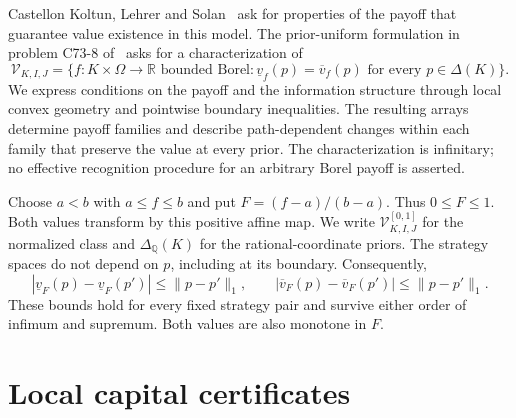 \documentclass[11pt,a4paper]{article}
\theoremstyle{definition}
\theoremstyle{remark}
\newcommand{\R}{\mathbb R}
\newcommand{\lv}{\underline v}
\newcommand{\uv}{\overline v}
\newcommand{\VV}{\mathcal V}
\begin{document}
Castellon Koltun, Lehrer and Solan~\cite[Section~5]{KLS} ask for properties of
the payoff that guarantee value existence in this model. The
prior-uniform formulation in problem C73-8 of~\cite{Catalogue} asks
for a characterization of
\[
 \VV_{K,I,J}
 =\{f:K\times\Omega\to\R\text{ bounded Borel}:
           \lv_f(p)=\uv_f(p)\text{ for every }p\in\Delta(K)\}.
\]
We express conditions on the payoff and the
information structure through local convex geometry and pointwise
boundary inequalities. The resulting arrays determine payoff families
and describe path-dependent changes within each family that preserve
the value at every prior.
The characterization is infinitary; no effective recognition
procedure for an arbitrary Borel payoff is asserted.

Choose $a<b$ with $a\leq f\leq b$ and put $F=(f-a)/(b-a)$. Thus
$0\leq F\leq1$. Both values transform by this positive affine map.
We write $\VV^{[0,1]}_{K,I,J}$ for the normalized class and
$\Delta_{\mathbb Q}(K)$ for the rational-coordinate priors. The
strategy spaces do not depend on $p$, including at its boundary.
Consequently,
\begin{equation}\label{eq:lipschitz}
 |\lv_F(p)-\lv_F(p')|\leq\|p-p'\|_1,\qquad
 |\uv_F(p)-\uv_F(p')|\leq\|p-p'\|_1.
\end{equation}
These bounds hold for every fixed strategy pair and survive either
order of infimum and supremum. Both values are also monotone in $F$.

\section{Local capital certificates}\label{sec:certificates}
\end{document}
